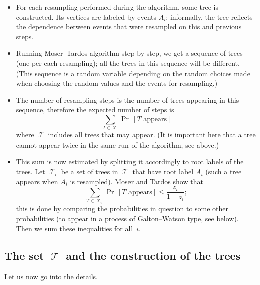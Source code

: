 \documentclass[12pt]{article}
\DeclareMathOperator{\Tr}{\mathcal{T}}
\begin{document}
\begin{itemize}

\item For each resampling performed during the algorithm, some tree is constructed. Its vertices are labeled by events $A_i$; informally, the tree reflects the dependence between events that were resampled on this and previous steps.

\item Running Moser--Tardos algorithm step by step, we get a sequence of trees (one per each resampling); all the trees in this sequence will be different. (This sequence is a random variable depending on the random choices made when choosing the random values and the events for resampling.)

\item The number of resampling steps is the number of trees appearing in this sequence, therefore the expected number of steps is
$$\sum_{T\in\Tr} \Pr\,[\text{$T$ appears}]$$
where $\Tr$ includes all trees that may appear. (It is important here that a tree cannot appear twice in the same run of the algorithm, see above.)

\item This sum is now estimated by splitting it accordingly to root labels of the trees. Let $\Tr_i$ be a set of trees in $\Tr$ that have root label $A_i$ (such a tree appears when $A_i$ is resampled). Moser and Tardos show that
$$\sum_{T\in\Tr_i} \Pr\,[\text{$T$ appears}]\le \frac{z_i}{1-z_i};$$
this is done by comparing the probabilities in question to some other probabilities (to appear in a process of Galton--Watson type, see below). Then we sum these inequalities for all~$i$.
\end{itemize}

\subsection{The set $\Tr$ and the construction of the trees}

Let us now go into the details.
\end{document}
